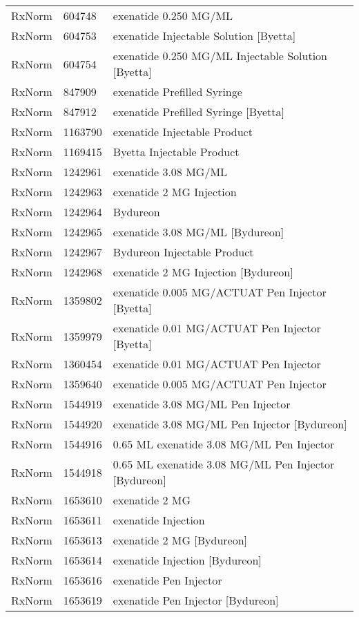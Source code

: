 \begin{longtable}{p{}p{}p{}}
  RxNorm & 604748 & exenatide 0.250 MG/ML \\ 
  RxNorm & 604753 & exenatide Injectable Solution [Byetta] \\ 
  RxNorm & 604754 & exenatide 0.250 MG/ML Injectable Solution [Byetta] \\ 
  RxNorm & 847909 & exenatide Prefilled Syringe \\ 
  RxNorm & 847912 & exenatide Prefilled Syringe [Byetta] \\ 
  RxNorm & 1163790 & exenatide Injectable Product \\ 
  RxNorm & 1169415 & Byetta Injectable Product \\ 
  RxNorm & 1242961 & exenatide 3.08 MG/ML \\ 
  RxNorm & 1242963 & exenatide 2 MG Injection \\ 
  RxNorm & 1242964 & Bydureon \\ 
  RxNorm & 1242965 & exenatide 3.08 MG/ML [Bydureon] \\ 
  RxNorm & 1242967 & Bydureon Injectable Product \\ 
  RxNorm & 1242968 & exenatide 2 MG Injection [Bydureon] \\ 
  RxNorm & 1359802 & exenatide 0.005 MG/ACTUAT Pen Injector [Byetta] \\ 
  RxNorm & 1359979 & exenatide 0.01 MG/ACTUAT Pen Injector [Byetta] \\ 
  RxNorm & 1360454 & exenatide 0.01 MG/ACTUAT Pen Injector \\ 
  RxNorm & 1359640 & exenatide 0.005 MG/ACTUAT Pen Injector \\ 
  RxNorm & 1544919 & exenatide 3.08 MG/ML Pen Injector \\ 
  RxNorm & 1544920 & exenatide 3.08 MG/ML Pen Injector [Bydureon] \\ 
  RxNorm & 1544916 & 0.65 ML exenatide 3.08 MG/ML Pen Injector \\ 
  RxNorm & 1544918 & 0.65 ML exenatide 3.08 MG/ML Pen Injector [Bydureon] \\ 
  RxNorm & 1653610 & exenatide 2 MG \\ 
  RxNorm & 1653611 & exenatide Injection \\ 
  RxNorm & 1653613 & exenatide 2 MG [Bydureon] \\ 
  RxNorm & 1653614 & exenatide Injection [Bydureon] \\ 
  RxNorm & 1653616 & exenatide Pen Injector \\ 
  RxNorm & 1653619 & exenatide Pen Injector [Bydureon] \\ 

\end{longtable}
